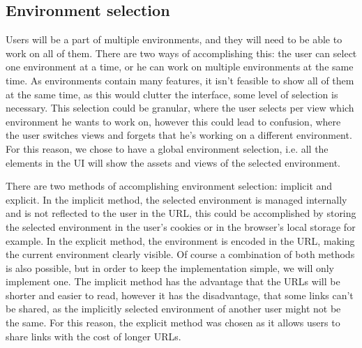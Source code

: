 



\subsection{Environment selection}

Users will be a part of multiple environments, and they will need to be able to work on
all of them.
There are two ways of accomplishing this: the user can select one environment at a time,
or he can work on multiple environments at the same time.
As environments contain many features, it isn't feasible to show all of them at the same
time, as this would clutter the interface, some level of selection is necessary.
This selection could be granular, where the user selects per view which environment he
wants to work on, however this could lead to confusion, where the user switches views and
forgets that he's working on a different environment.
For this reason, we chose to have a global environment selection, i.e. all the elements in
the UI will show the assets and views of the selected environment.

There are two methods of accomplishing environment selection: implicit and explicit.
In the implicit method, the selected environment is managed internally and is not
reflected to the user in the URL, this could be accomplished by storing the selected
environment in the user's cookies or in the browser's local storage for example.
In the explicit method, the environment is encoded in the URL,
making the current environment clearly visible.
Of course a combination of both methods is also possible, but in order to keep the
implementation simple, we will only implement one.
The implicit method has the advantage that the URLs will be shorter and easier to read,
however it has the disadvantage, that some links can't be shared, as the implicitly
selected environment of another user might not be the same. 
For this reason, the explicit method was chosen as it allows users to share links with the
cost of longer URLs.

